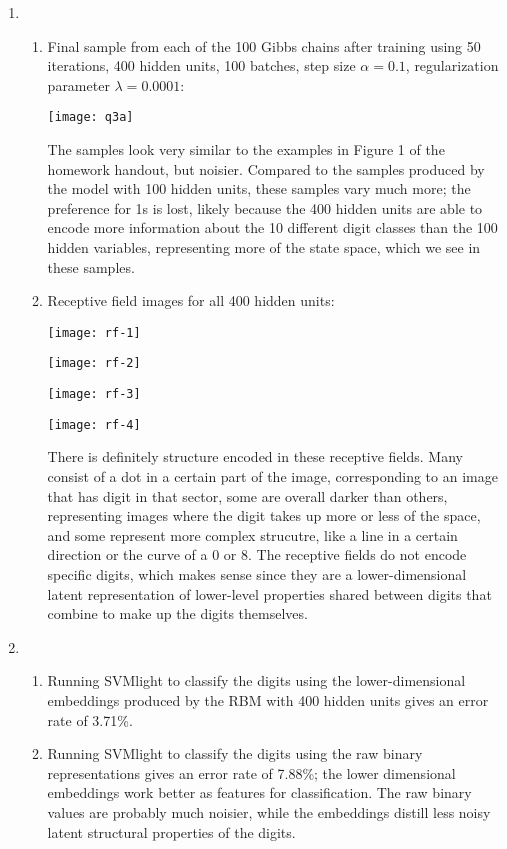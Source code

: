 \documentclass[12pt]{article}
\begin{document}
\begin{enumerate}
\begin{enumerate}
\end{enumerate}

\item %
\begin{enumerate}
\item
Final sample from each of the 100 Gibbs chains after training using 50 iterations, 400 hidden units, 100 batches, step size $\alpha=0.1$, regularization parameter $\lambda=0.0001$:
\begin{center}
\texttt{[image: q3a]}
\end{center}
The samples look very similar to the examples in Figure 1 of the homework handout, but noisier. Compared to the samples produced by the model with 100 hidden units, these samples vary much more; the preference for 1s is lost, likely because the 400 hidden units are able to encode more information about the 10 different digit classes than the 100 hidden variables, representing more of the state space, which we see in these samples.

\item
Receptive field images for all 400 hidden units:
\begin{center}
\texttt{[image: rf-1]}
\end{center}
\begin{center}
\texttt{[image: rf-2]}
\end{center}
\begin{center}
\texttt{[image: rf-3]}
\end{center}
\begin{center}
\texttt{[image: rf-4]}
\end{center}
There is definitely structure encoded in these receptive fields. Many consist of a dot in a certain part of the image, corresponding to an image that has digit in that sector, some are overall darker than others, representing images where the digit takes up more or less of the space, and some represent more complex strucutre, like a line in a certain direction or the curve of a 0 or 8. The receptive fields do not encode specific digits, which makes sense since they are a lower-dimensional latent representation of lower-level properties shared between digits that combine to make up the digits themselves.

\end{enumerate}

\item %
\begin{enumerate}
\item Running SVMlight to classify the digits using the lower-dimensional embeddings produced by the RBM with 400 hidden units gives an error rate of 3.71\%.
\item Running SVMlight to classify the digits using the raw binary representations gives an error rate of 7.88\%; the lower dimensional embeddings work better as features for classification. The raw binary values are probably much noisier, while the embeddings distill less noisy latent structural properties of the digits.
\end{enumerate}

\end{enumerate}
\end{document}
